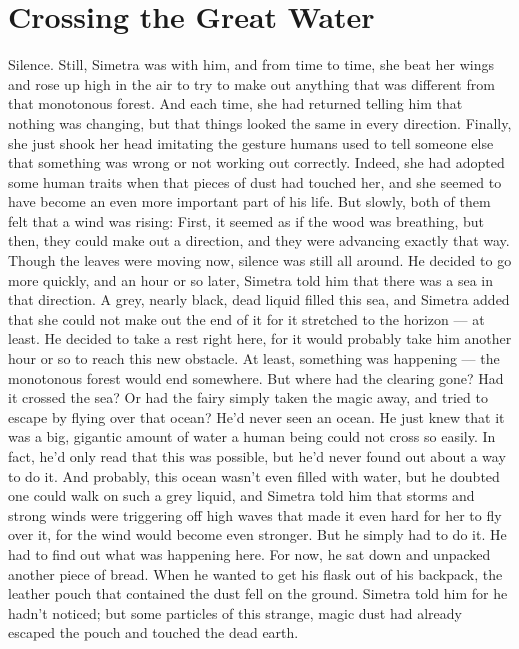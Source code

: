 \chapter{Crossing the Great Water}
\label{cha:crossing-great-water}
Silence. 
Still, Simetra was with him, and from time to time, she beat her wings and rose up high in the air to try to make out anything that was different from that monotonous forest. And each time, she had returned telling him that nothing was changing, but that things looked the same in every direction. Finally, she just shook her head imitating the gesture humans used to tell someone else that something was wrong or not working out correctly. 
Indeed, she had adopted some human traits when that pieces of dust had touched her, and she seemed to have become an even more important part of his life. 
But slowly, both of them felt that a wind was rising: First, it seemed as if the wood was breathing, but then, they could make out a direction, and they were advancing exactly that way. Though the leaves were moving now, silence was still all around. 
He decided to go more quickly, and an hour or so later, Simetra told him that there was a sea in that direction. A grey, nearly black, dead liquid filled this sea, and Simetra added that she could not make out the end of it for it stretched to the horizon --- at least. 
He decided to take a rest right here, for it would probably take him another hour or so to reach this new obstacle. At least, something was happening --- the monotonous forest would end somewhere. 
But where had the clearing gone? 
Had it crossed the sea? Or had the fairy simply taken the magic away, and tried to escape by flying over that ocean? 
He'd never seen an ocean. He just knew that it was a big, gigantic amount of water a human being could not cross so easily. In fact, he'd only read that this was possible, but he'd never found out about a way to do it. 
And probably, this ocean wasn't even filled with water, but he doubted one could walk on such a grey liquid, and Simetra told him that storms and strong winds were triggering off high waves that made it even hard for her to fly over it, for the wind would become even stronger. 
But he simply had to do it. 
He had to find out what was happening here. 
For now, he sat down and unpacked another piece of bread. 
When he wanted to get his flask out of his backpack, the leather pouch that contained the dust fell on the ground. Simetra told him for he hadn't noticed; but some particles of this strange, magic dust had already escaped the pouch and touched the dead earth. 
